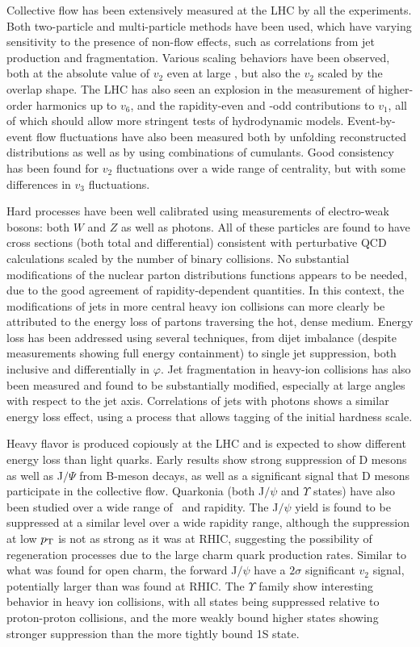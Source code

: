 Collective flow has been extensively measured at the LHC by all the experiments.
Both two-particle and multi-particle methods have been used, which have varying sensitivity to
the presence of non-flow effects, such as correlations from jet production and fragmentation.
Various scaling behaviors have been observed, both at the absolute value of $v_2$ even at
large \pT, but also the $v_2$ scaled by the overlap shape.
The LHC has also seen an explosion in the measurement of higher-order harmonics up to $v_6$,
and the rapidity-even and -odd contributions to $v_1$, all of which should
allow more stringent tests of hydrodynamic models.
Event-by-event flow fluctuations have also been measured both by unfolding reconstructed
distributions as well as by using combinations of cumulants.  Good consistency has been found
for $v_2$ fluctuations over a wide range of centrality, but with some differences in $v_3$
fluctuations.

Hard processes have been well calibrated using measurements of electro-weak bosons: both
$W$ and $Z$ as well as photons.  All of these particles are found to have cross sections
(both total and differential)
consistent with perturbative QCD calculations scaled by the number of binary collisions.
No substantial modifications of the nuclear parton distributions functions appears to be needed, due to the good
agreement of rapidity-dependent quantities.
In this context, the modifications of jets in more central heavy ion collisions can more
clearly be attributed to the energy loss of partons traversing the hot, dense medium.
Energy loss has been addressed using several techniques, from dijet imbalance (despite measurements
showing full energy containment) to
single jet suppression, both inclusive and differentially in $\varphi$.  Jet fragmentation
in heavy-ion collisions has also been measured and found to be substantially modified, especially at
large angles with respect to the jet axis.
Correlations of jets with photons shows a similar energy loss effect, using a process that allows
tagging of the initial hardness scale.

Heavy flavor is produced copiously at the LHC and is expected to show different energy loss than
light quarks.  Early results show strong suppression of D mesons as well as J$/\Psi$ from
B-meson decays, as well as a significant signal that D mesons participate in the collective flow.
Quarkonia (both J$/\psi$ and $\Upsilon$ states) have also been studied over a wide range of \pT\
and rapidity.  The J$/\psi$ yield is found to be suppressed at a similar level over a wide
rapidity range, although the suppression at low $\mbox{$p_{\mathrm{T}}$}$ is not as strong as it was at
RHIC, suggesting the possibility of regeneration processes due to the large charm quark production
rates.  Similar to what was found for open charm, the forward J$/\psi$ have a
$2\sigma$ significant $v_2$ signal, potentially larger than was found at RHIC.
The $\Upsilon$ family show interesting behavior in heavy ion collisions, with all states being
suppressed relative to proton-proton collisions, and the more weakly bound higher states showing
stronger suppression than the more tightly bound 1S state.

